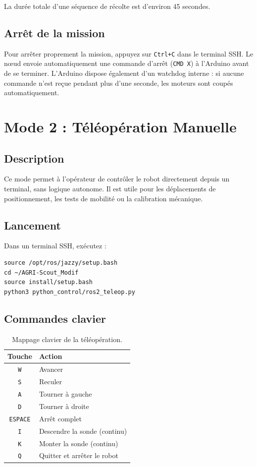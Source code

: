 \documentclass [12pt, a4paper]{article}
\begin{document}
La durée totale d'une séquence de récolte est d'environ 45 secondes.

\subsection{Arrêt de la mission}
Pour arrêter proprement la mission, appuyez sur \texttt{Ctrl+C} dans le terminal SSH. Le nœud envoie automatiquement une commande d'arrêt (\texttt{CMD X}) à l'Arduino avant de se terminer. L'Arduino dispose également d'un watchdog interne : si aucune commande n'est reçue pendant plus d'une seconde, les moteurs sont coupés automatiquement.

\section{Mode 2 : Téléopération Manuelle}

\subsection{Description}
Ce mode permet à l'opérateur de contrôler le robot directement depuis un terminal, sans logique autonome. Il est utile pour les déplacements de positionnement, les tests de mobilité ou la calibration mécanique.

\subsection{Lancement}
Dans un terminal SSH, exécutez :
\begin{verbatim}
source /opt/ros/jazzy/setup.bash
cd ~/AGRI-Scout_Modif
source install/setup.bash
python3 python_control/ros2_teleop.py
\end{verbatim}

\subsection{Commandes clavier}
\begin{table}[H]
\centering
\begin{tabular}{cl}
\toprule
\textbf{Touche} & \textbf{Action} \\
\midrule
\texttt{W} & Avancer \\
\texttt{S} & Reculer \\
\texttt{A} & Tourner à gauche \\
\texttt{D} & Tourner à droite \\
\texttt{ESPACE} & Arrêt complet \\
\texttt{I} & Descendre la sonde (continu) \\
\texttt{K} & Monter la sonde (continu) \\
\texttt{Q} & Quitter et arrêter le robot \\
\bottomrule
\end{tabular}
\caption{Mappage clavier de la téléopération.}
\end{table}
\end{document}
